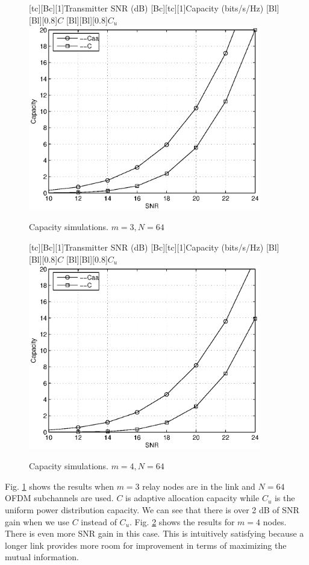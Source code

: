 \documentclass[12]{article}
\begin{document}
\begin{figure}
\centering
{}[tc][Bc][1]{Transmitter SNR (dB)}
[Bc][tc][1]{Capacity (bits/s/Hz)}
[Bl][Bl][0.8]{$C$}
[Bl][Bl][0.8]{$C_u$}
\includegraphics[width=4in]{m=03_N=064.eps}
\caption{Capacity simulations.  $m = 3, N = 64$}
\label{0364}
\end{figure}
\begin{figure}
\centering
{}[tc][Bc][1]{Transmitter SNR (dB)}
[Bc][tc][1]{Capacity (bits/s/Hz)}
[Bl][Bl][0.8]{$C$}
[Bl][Bl][0.8]{$C_u$}
\includegraphics[width=4in]{m=04_N=064.eps}
\caption{Capacity simulations.  $m = 4, N = 64$}
\label{0464}
\end{figure}
Fig. \ref{0364} shows the results when $m=3$ relay nodes are in the link and $N=64$ OFDM subchannels are used.  $C$ is adaptive allocation capacity while $C_u$ is the uniform power distribution capacity.  We can see that there is over 2 dB of SNR gain when we use $C$ instead of $C_u$.  Fig. \ref{0464} shows the results for $m=4$ nodes.  There is even more SNR gain in this case.  This is intuitively satisfying because a longer link provides more room for improvement in terms of maximizing the mutual information.
\end{document}
